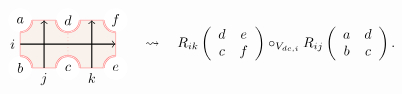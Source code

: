 \begin{equation}
    \begin{tikzpicture}[scale=0.6, baseline=(x.base)]
        \node (x) at (0,0) {\vphantom{x}};

        \draw[color=red!50, fill=brown!10] (-1,-1) rectangle (3,1);
        \draw[color=red!50, dotted] (1,-1) -- (1,1);

        \fill[color=white] (-1,1) circle (0.5);  \node (a) at (-1,1) {$a$};
        \draw[draw=red!50, double]  (-1,0.5) arc (-90:0:0.5);
        \fill[color=white] (-1,-1) circle (0.5);  \node (b) at (-1,-1) {$b$};
        \draw[draw=red!50, double]  (-1,-0.5) arc (90:0:0.5);
        \fill[color=white] (1,-1) circle (0.5);  \node (c) at (1,-1) {$c$};
        \draw[draw=red!50, double]  (1.5,-1) arc (0:180:0.5);
        \fill[color=white] (1,1) circle (0.5);  \node (d) at (1,1) {$d$};
        \draw[draw=red!50, double]  (1.5,1) arc (0:-180:0.5);
        \fill[color=white] (3,-1) circle (0.5);  \node (e) at (3,-1) {$e$};
        \draw[draw=red!50, double]  (3,-0.5) arc (90:180:0.5);
        \fill[color=white] (3,1) circle (0.5);  \node (f) at (3,1) {$f$};
        \draw[draw=red!50, double]  (3,0.5) arc (-90:-180:0.5);

        \draw[thick, ->] (-1,0) node[left] {$i$} -- (3,0);
        \draw[thick, ->] (0,-1) node[below] {$j$} -- (0,1);
        \draw[thick, ->] (2,-1) node[below] {$k$} -- (2,1);

    \end{tikzpicture}
  \quad \rightsquigarrow \quad
R_{ik}\left(%
  \begin{array}{cc}
        d & e\\
        c & f
  \end{array}%
\right)
  \circ_{V_{dc,i}}
R_{ij}\left(%
  \begin{array}{cc}
        a & d\\
        b & c
  \end{array}%
\right).
\end{equation}

